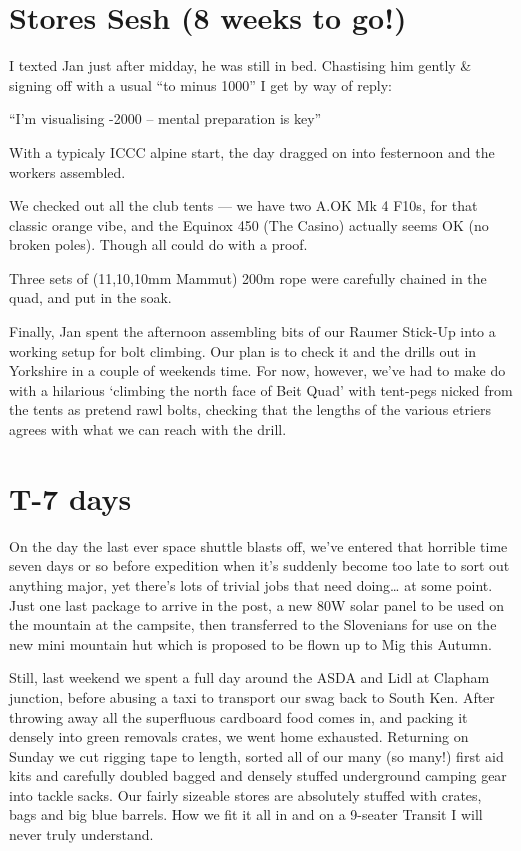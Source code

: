 \section{Stores Sesh (8 weeks to go!)}

I texted Jan just after midday, he was still in bed. Chastising him
gently \& signing off with a usual “to minus 1000” I get by way of
reply:

“I’m visualising -2000 – mental preparation is key”

With a typicaly ICCC alpine start, the day dragged on into festernoon and the workers assembled.

We checked out all the club tents — we have two A.OK Mk 4 F10s, for
that classic orange vibe, and the Equinox 450 (The Casino) actually
seems OK (no broken poles). Though all could do with a proof.

Three sets of (11,10,10mm Mammut) 200m rope were carefully chained in
the quad, and put in the soak.

Finally, Jan spent the afternoon assembling bits of our Raumer
Stick-Up into a working setup for bolt climbing. Our plan is to check
it and the drills out in Yorkshire in a couple of weekends time. For
now, however, we’ve had to make do with a hilarious ‘climbing the
north face of Beit Quad’ with tent-pegs nicked from the tents as
pretend rawl bolts, checking that the lengths of the various etriers
agrees with what we can reach with the drill. 



\section{T-7 days}

On the day the last ever space shuttle blasts off, we’ve entered that
horrible time seven days or so before expedition when it’s suddenly
become too late to sort out anything major, yet there’s lots of
trivial jobs that need doing… at some point. Just one last package
to arrive in the post, a new 80W solar panel to be used on the
mountain at the campsite, then transferred to the Slovenians for use
on the new mini mountain hut which is proposed to be flown up to Mig
this Autumn.

Still, last weekend we spent a full day around the ASDA and Lidl at
Clapham junction, before abusing a taxi to transport our swag back to
South Ken. After throwing away all the superfluous cardboard food
comes in, and packing it densely into green removals crates, we went
home exhausted. Returning on Sunday we cut rigging tape to length,
sorted all of our many (so many!) first aid kits and carefully doubled
bagged and densely stuffed underground camping gear into tackle sacks.
Our fairly sizeable stores are absolutely stuffed with crates, bags
and big blue barrels. How we fit it all in and on a 9-seater Transit I
will never truly understand.

